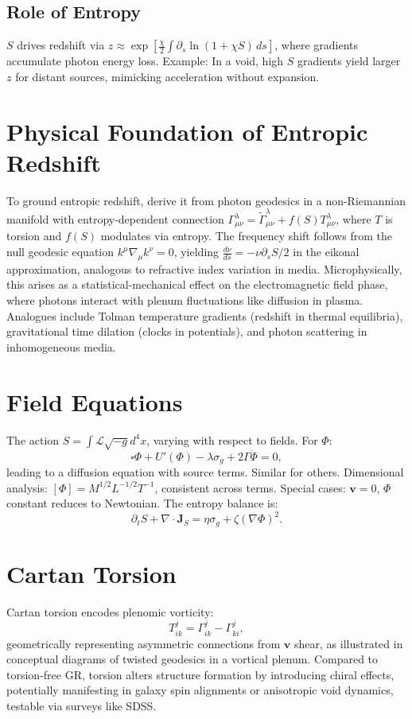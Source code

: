 \documentclass[11pt]{article}
\theoremstyle{plain}
\theoremstyle{definition}
\begin{document}
\subsection{Role of Entropy}
$S$ drives redshift via $z \approx \exp\left[\frac{\chi}{2} \int \partial_s \ln(1 + \chi S) \, ds\right]$, where gradients accumulate photon energy loss. Example: In a void, high $S$ gradients yield larger $z$ for distant sources, mimicking acceleration without expansion.
\section{Physical Foundation of Entropic Redshift}
To ground entropic redshift, derive it from photon geodesics in a non-Riemannian manifold with entropy-dependent connection $\Gamma^\lambda_{\mu\nu} = \tilde{\Gamma}^\lambda_{\mu\nu} + f(S) T^\lambda_{\mu\nu}$, where $T$ is torsion and $f(S)$ modulates via entropy.
The frequency shift follows from the null geodesic equation $k^\mu \nabla_\mu k^\nu = 0$, yielding $\frac{d\nu}{ds} = -\nu \partial_s S / 2$ in the eikonal approximation, analogous to refractive index variation in media.
Microphysically, this arises as a statistical-mechanical effect on the electromagnetic field phase, where photons interact with plenum fluctuations like diffusion in plasma.
Analogues include Tolman temperature gradients (redshift in thermal equilibria), gravitational time dilation (clocks in potentials), and photon scattering in inhomogeneous media.
\section{Field Equations}
The action $S = \int \mathcal{L} \sqrt{-g} d^4x$, varying with respect to fields. For $\Phi$:
\[
\square \Phi + U'(\Phi) - \lambda \sigma_g + 2\Gamma \ddot{\Phi} = 0,
\]
leading to a diffusion equation with source terms. Similar for others.
Dimensional analysis: $[\Phi] = M^{1/2} L^{-1/2} T^{-1}$, consistent across terms.
Special cases: $\bm{v} = 0$, $\Phi$ constant reduces to Newtonian.
The entropy balance is:
\begin{equation}
\partial_t S + \nabla \cdot \bm{J}_S = \eta \sigma_g + \zeta (\nabla \Phi)^2.
\end{equation}
\section{Cartan Torsion}
Cartan torsion encodes plenomic vorticity:
\begin{equation}
T^j_{ik} = \Gamma^j_{ik} - \Gamma^j_{ki},
\end{equation}
geometrically representing asymmetric connections from $\bm{v}$ shear, as illustrated in conceptual diagrams of twisted geodesics in a vortical plenum.
Compared to torsion-free GR, torsion alters structure formation by introducing chiral effects, potentially manifesting in galaxy spin alignments or anisotropic void dynamics, testable via surveys like SDSS.
\end{document}
